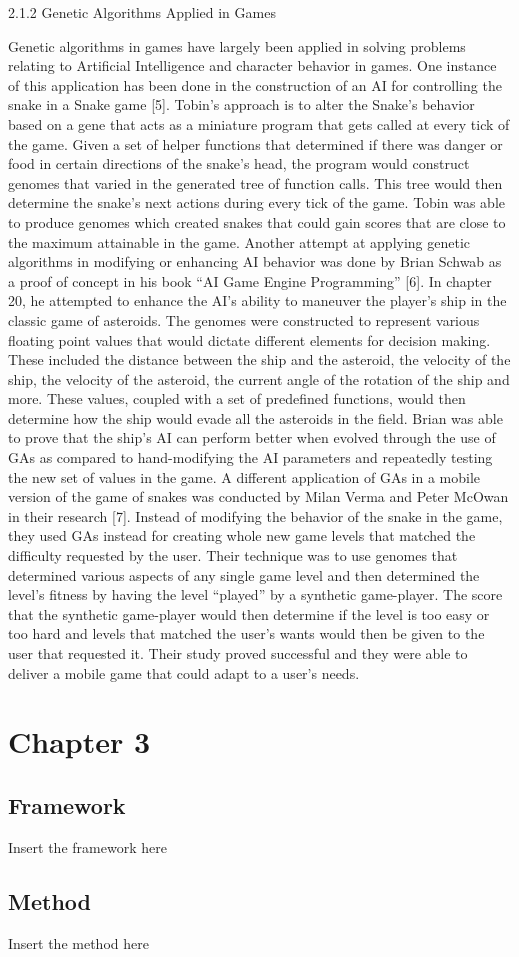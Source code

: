 \documentclass[letterpaper,10pt,titlepage]{article}
\begin{document}
2.1.2	Genetic Algorithms Applied in Games

	Genetic algorithms in games have largely been applied in solving problems relating to Artificial Intelligence and character behavior in games. One instance of this application 
	has been done in the construction of an AI for controlling the snake in a Snake game [5]. Tobin's approach is to alter the Snake's behavior based on a gene that acts as a miniature 
	program that gets called at every tick of the game. Given a set of helper functions that determined if there was danger or food in certain directions of the snake's head, the program 
	would construct genomes that varied in the generated tree of function calls. This tree would then determine the snake's next actions during every tick of the game. Tobin was able to 
	produce genomes which created snakes that could gain scores that are close to the maximum attainable in the game.  Another attempt at applying genetic algorithms in modifying or 
	enhancing AI behavior was done by Brian Schwab as a proof of concept in his book “AI Game Engine Programming” [6]. In chapter 20, he attempted to enhance the AI's ability to maneuver 
	the player's ship in the classic game of asteroids. The genomes were constructed to represent various floating point values that would dictate different elements for decision making. 
	These included the distance between the ship and the asteroid, the velocity of the ship, the velocity of the asteroid, the current angle of the rotation of the ship and more. 
	These values, coupled with a set of predefined functions, would then determine how the ship would evade all the asteroids in the field. Brian was able to prove that the ship's AI can 
	perform better when evolved through the use of GAs as compared to hand-modifying the AI parameters and repeatedly testing the new set of values in the game.
	A different application of GAs in a mobile version of the game of snakes was conducted by Milan Verma and Peter McOwan in their research [7]. Instead of modifying the behavior of the 
	snake in the game, they used GAs instead for creating whole new game levels that matched the difficulty requested by the user. Their technique was to use genomes that determined various 
	aspects of any single game level and then determined the level's fitness by having the level “played” by a synthetic game-player. The score that the synthetic game-player would then determine 
	if the level is too easy or too hard and levels that matched the user's wants would then be given to the user that requested it. Their study proved successful and they were able to deliver a 
	mobile game that could adapt to a user's needs.


\section*{Chapter 3}


\subsection*{Framework}
Insert the framework here


\subsection*{Method}
Insert the method here
\end{document}
